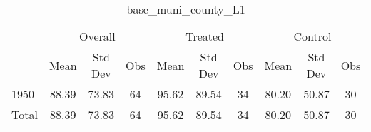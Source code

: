 \begin{table}[htbp]\centering
\def\sym#1{\ifmmode^{#1}\else\(^{#1}\)\fi}
\caption{base\_muni\_county\_L1 \label{tab1}}
\begin{tabular}{l*{3}{ccc}}
\toprule
                    &\multicolumn{3}{c}{Overall}           &\multicolumn{3}{c}{Treated}           &\multicolumn{3}{c}{Control}           \\
                    &        Mean&     Std Dev&         Obs&        Mean&     Std Dev&         Obs&        Mean&     Std Dev&         Obs\\
\midrule
1950                &       88.39&       73.83&          64&       95.62&       89.54&          34&       80.20&       50.87&          30\\
Total               &       88.39&       73.83&          64&       95.62&       89.54&          34&       80.20&       50.87&          30\\
\bottomrule
\end{tabular}
\end{table}

